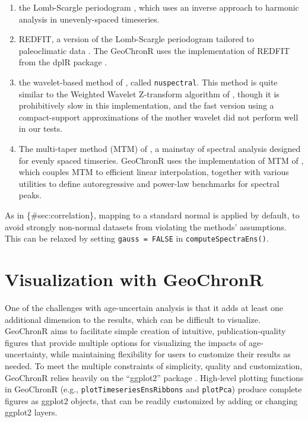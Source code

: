 \documentclass[gchron, manuscript]{copernicus}
\begin{document}
\begin{enumerate}
\def\labelenumi{\arabic{enumi}.}
\item
  the Lomb-Scargle periodogram \citep{VanderPlas_2018}, which uses an inverse approach to harmonic analysis in unevenly-spaced timeseries.
\item
  REDFIT, a version of the Lomb-Scargle periodogram tailored to paleoclimatic data \citep{SchulzMudelsee_02, Mudelsee_02, Mudelsee_NPG09}.
  The GeoChronR uses the implementation of REDFIT from the dplR package \citep{Bunn2008115}.
\item
  the wavelet-based method of \citet{Mathias_JSS04}, called \texttt{nuspectral}. This method is quite similar to the Weighted Wavelet Z-transform algorithm of \citet{Foster_AJ96}, though it is prohibitively slow in this implementation, and the fast version using a compact-support approximations of the mother wavelet did not perform well in our tests.
\item
  The multi-taper method (MTM) of \citet{thomson82}, a mainstay of spectral analysis \citep{Ghil02} designed for evenly spaced timseries.
  GeoChronR uses the implementation of MTM of \citet{astrochron}, which couples MTM to efficient linear interpolation, together with various utilities to define autoregressive and power-law benchmarks for spectral peaks.
\end{enumerate}

As in \citet{ref}\{\#sec:correlation\}, mapping to a standard normal is applied by default, to avoid strongly non-normal datasets from violating the methods' assumptions. This can be relaxed by setting \texttt{gauss\ =\ FALSE} in \texttt{computeSpectraEns()}.

\hypertarget{sec:visualization}{%
\section{Visualization with GeoChronR}\label{sec:visualization}}

One of the challenges with age-uncertain analysis is that it adds at least one additional dimension to the results, which can be difficult to visualize.
GeoChronR aims to facilitate simple creation of intuitive, publication-quality figures that provide multiple options for visualizing the impacts of age-uncertainty, while maintaining flexibility for users to customize their results as needed.
To meet the multiple constraints of simplicity, quality and customization, GeoChronR relies heavily on the ``ggplot2'' package \citep{ggplot2}.
High-level plotting functions in GeoChronR (e.g., \texttt{plotTimeseriesEnsRibbons} and \texttt{plotPca}) produce complete figures as ggplot2 objects, that can be readily customized by adding or changing ggplot2 layers.
\end{document}
